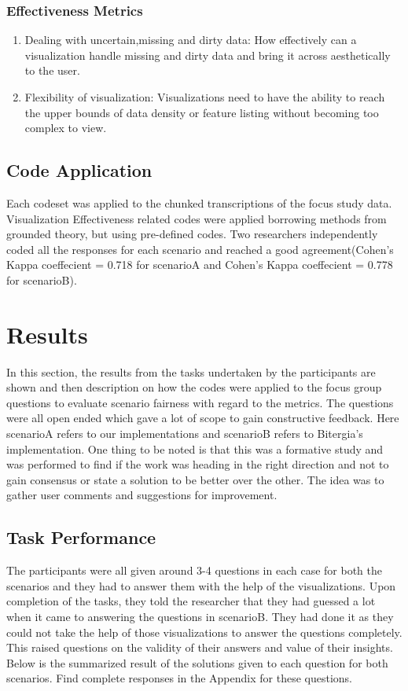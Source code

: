 \documentclass[seploa]{beavtex}
\begin{document}
\subsection{Effectiveness Metrics}

\begin{enumerate}
\item Dealing with uncertain,missing and dirty data: How effectively can a visualization handle missing and dirty data and bring it across aesthetically to the user\cite{grins2001}.

\item Flexibility of visualization: Visualizations need to have the ability to reach the upper bounds of data density or feature listing without becoming too complex to view\cite{grins2001}.
\end{enumerate}

\section{Code Application}
Each codeset was applied to the chunked transcriptions of the focus study data. Visualization Effectiveness related  codes  were  applied borrowing methods from  grounded theory\cite{corbin2008}, but using pre-­defined codes. Two researchers independently coded all the responses for each scenario and reached a good agreement(Cohen’s  Kappa  coeffecient  =  0.718 for scenarioA and Cohen’s  Kappa  coeffecient  =  0.778 for scenarioB).

\chapter{Results}
In this section, the results from the tasks undertaken by the participants are shown and then description on how the codes were applied to the focus group questions to evaluate scenario fairness with regard to the metrics. The questions were all open ended which gave a lot of scope to gain constructive feedback. Here scenarioA refers to our implementations and scenarioB refers to Bitergia's implementation. One thing to be noted is that this was a formative study and was performed to find if the work was heading in the right direction and not to gain consensus or state a solution to be better over the other. The idea was to gather user comments and suggestions for improvement.

\section{Task Performance}
The participants were all given around 3-4 questions in each case for both the scenarios and they had to answer them with the help of the visualizations. Upon completion of the tasks, they told the researcher that they had guessed a lot when it came to answering the questions in scenarioB. They had done it as they could not take the help of those visualizations to answer the questions completely. This raised questions on the validity of their answers and value of their insights. Below is the summarized result of the solutions given to each question for both scenarios. Find complete responses in the Appendix for these questions.
\end{document}
